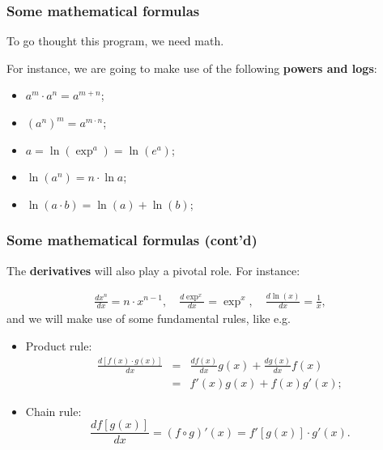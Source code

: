 \documentclass[notes=show,handout]{beamer}
\newcommand{\bea}{\begin{eqnarray}}
\newcommand{\eea}{\end{eqnarray}}
\newcommand{\nn}{\nonumber}
\begin{document}
\begin{frame}
\frametitle{Some mathematical formulas}

To go thought this program, we need math. 
 
\vspace{0.4cm}

For instance, we are going to make use of the following \textbf{powers and logs}:
\vspace{0.4cm}
\begin{itemize}
\item $a^m \cdot a^n = a^{m+n}$;
\item $(a^n)^m = a^{m \cdot n}$;
\item $a=\ln(\exp^{a}) = \ln(e^a)$;
\item $\ln(a^n) = n \cdot \ln a$;
\item $\ln (a \cdot b) = \ln (a) + \ln (b)$;

\end{itemize}

\end{frame}




\begin{frame}
\frametitle{Some mathematical formulas (cont'd)}

The \textbf{derivatives} will also play a pivotal role. For instance:

\bea
 \frac{d x^n}{dx} = n \cdot x^{n-1}, \quad \frac{d \exp^{x}}{dx} = \exp^{x} , \quad
\frac{d \ln({x})}{dx} = \frac{1}{x}, \nn
\eea
and we will make use of some fundamental rules, like e.g.

\begin{itemize}
\item Product rule: 
\bea
\frac{d [f(x)\cdot g(x)]}{dx} &=& \frac{df(x)}{dx} g(x) + \frac{dg(x)}{dx} f(x) \nn \\ 
&=& f'(x) g(x)+ f(x) g'(x) \nn ;
\eea
\item Chain rule: $$ \frac{d f[g(x)]}{dx} =  (f\circ g)'(x) = f'[g(x)] \cdot g'(x). $$
\end{itemize}
\end{frame}
\end{document}
